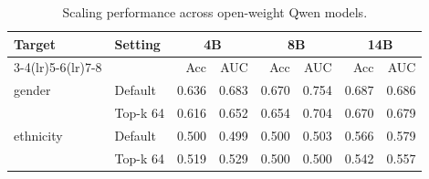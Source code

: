 \begin{table}[htbp]
\centering
\caption{Scaling performance across open-weight Qwen models.}
\label{tab:qwen_scaling_seed_performance}
\setlength{\tabcolsep}{8pt}
\begin{tabular}{llrrrrrr}
\toprule
Target & Setting & \multicolumn{2}{c}{4B} & \multicolumn{2}{c}{8B} & \multicolumn{2}{c}{14B} \\
\cmidrule(lr){3-4}\cmidrule(lr){5-6}\cmidrule(lr){7-8}
 & & Acc & AUC & Acc & AUC & Acc & AUC \\
\midrule
gender & Default & 0.636 & 0.683 & 0.670 & 0.754 & 0.687 & 0.686 \\
 & Top-k 64 & 0.616 & 0.652 & 0.654 & 0.704 & 0.670 & 0.679 \\
\midrule
ethnicity & Default & 0.500 & 0.499 & 0.500 & 0.503 & 0.566 & 0.579 \\
 & Top-k 64 & 0.519 & 0.529 & 0.500 & 0.500 & 0.542 & 0.557 \\
\bottomrule
\end{tabular}
\end{table}
